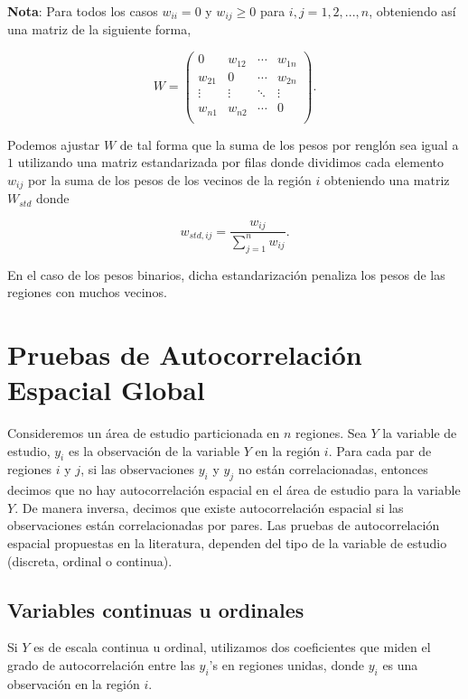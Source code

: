 \textbf{Nota}: Para todos los casos  $w_{ii}=0$ y $w_{ij} \geq 0$ para $i,j=1,2,...,n$, obteniendo así una matriz de la siguiente forma,

\begin{equation}
W= \begin{pmatrix}
 0 & w_{12} & \cdots & w_{1n} \\
 w_{21} & 0 & \cdots & w_{2n}  \\
 \vdots & \vdots & \ddots & \vdots \\
 w_{n1} & w_{n2} & \cdots & 0  \\
\end{pmatrix}.
\end{equation}

Podemos ajustar $W$ de tal forma que la suma de los pesos por renglón sea igual a $1$  utilizando una matriz estandarizada por filas donde dividimos cada elemento $w_{ij}$ por la suma de los pesos de los vecinos de la región $i$ obteniendo una matriz $W_{std}$ donde

\begin{equation}
w_{std,ij}=\dfrac{w_{ij}}{\displaystyle \sum_{j=1}^n w_{ij}}.
\end{equation}

En el caso de los pesos binarios, dicha estandarización penaliza los pesos de las regiones con muchos vecinos.


\section{Pruebas de Autocorrelación Espacial Global}
Consideremos un área de estudio particionada en $n$ regiones. Sea $Y$ la variable de estudio, $y_i$ es la observación de la variable $Y$ en la región $i$.  Para cada par de regiones $i$ y $j$, si las observaciones $y_i$ y $y_j$ no están correlacionadas, entonces decimos que no hay autocorrelación espacial en el área de estudio para la variable $Y$. De manera inversa, decimos que existe autocorrelación espacial si las observaciones están correlacionadas por pares. Las pruebas de autocorrelación espacial propuestas en la literatura, dependen del tipo de la variable de estudio (discreta, ordinal o continua).

\subsection{Variables continuas u ordinales}
Si $Y$ es de escala continua u ordinal, utilizamos dos coeficientes que miden el grado de autocorrelación entre las $y_i$'s en regiones unidas, donde $y_i$ es una observación en la región $i$.


